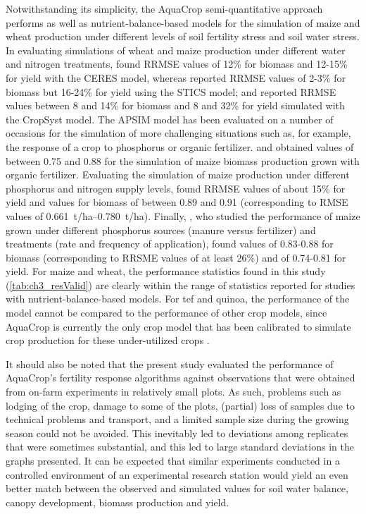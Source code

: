 Notwithstanding its simplicity, the AquaCrop semi-quantitative approach performs as well as nutrient-balance-based models for the simulation of maize and wheat production under different levels of soil fertility stress and soil water stress. In evaluating simulations of wheat and maize production under different water and nitrogen treatments, \textcite{fang2008} found RRMSE values of 12\% for biomass and 12-15\% for yield with the CERES model, whereas \textcite{brisson2002} reported RRMSE values of 2-3\% for biomass but 16-24\% for yield using the STICS model; and \textcite{stockle2003} reported RRMSE values between 8 and 14\% for biomass and 8 and 32\% for yield simulated with the CropSyst model. The APSIM model has been evaluated on a number of occasions for the simulation of more challenging situations such as, for example, the response of a crop to phosphorus or organic fertilizer. \textcite{micheni2004} and \textcite{kinyangi2004} obtained \Rsq values of between 0.75 and 0.88 for the simulation of maize biomass production grown with organic fertilizer. Evaluating the simulation of maize production under different phosphorus and nitrogen supply levels, \textcite{fosumensah2012} found RRMSE values of about 15\% for yield and \Rsq values for biomass of between 0.89 and 0.91 (corresponding to RMSE values of \SIrange[range-phrase=-]{0.661}{0.780}{t/ha}). Finally, \textcite{delve2009}, who studied the performance of maize grown under different phosphorus sources (manure versus fertilizer) and treatments (rate and frequency of application), found \Rsq values of 0.83-0.88 for biomass (corresponding to RRSME values of at least 26\%) and of 0.74-0.81 for yield. For maize and wheat, the performance statistics found in this study (\autoref{tab:ch3_resValid}) are clearly within the range of statistics reported for studies with nutrient-balance-based models. For tef and quinoa, the performance of the model cannot be compared to the performance of other crop models, since AquaCrop is currently the only crop model that has been calibrated to simulate crop production for these under-utilized crops \parencite{geerts2009a, tsegay2012}.

It should also be noted that the present study evaluated the performance of AquaCrop's fertility response algorithms against observations that were obtained from on-farm experiments in relatively small plots. As such, problems such as lodging of the crop, damage to some of the plots, (partial) loss of samples due to technical problems and transport, and a limited sample size during the growing season could not be avoided. This inevitably led to deviations among replicates that were sometimes substantial, and this led to large standard deviations in the graphs presented. It can be expected that similar experiments conducted in a controlled environment of an experimental research station would yield an even better match between the observed and simulated values for soil water balance, canopy development, biomass production and yield.

